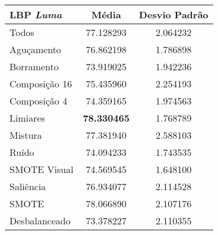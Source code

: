 

\begin{table}[!htbp]
\centering
\caption{}
\label{tab:resultados:x:melhor}
\begin{tabular}{|l|c|c|}
\hline
\textbf{LBP \emph{Luma}} & \textbf{Média}     & \textbf{Desvio Padrão} \\ \hline
   Todos        &  77.128293 &  2.064232  \\ \hline
  Aguçamento    &  76.862198 &  1.786898  \\ \hline
  Borramento    &  73.919025 &  1.942236  \\ \hline
  Composição 16 &  75.435960 &  2.254193  \\ \hline
  Composição 4  &  74.359165 &  1.974563  \\ \hline
  Limiares      &  \textbf{78.330465} &  1.768789  \\ \hline
  Mistura       &  77.381940 &  2.588103  \\ \hline
  Ruído         &  74.094233 &  1.743535  \\ \hline
  SMOTE Visual  &  74.569545 &  1.648100  \\ \hline
  Saliência     &  76.934077 &  2.114528  \\ \hline
 SMOTE          &  78.066890 &  2.107176  \\ \hline
Desbalanceado   &  73.378227 &  2.110355  \\ \hline
\end{tabular}
\end{table}


